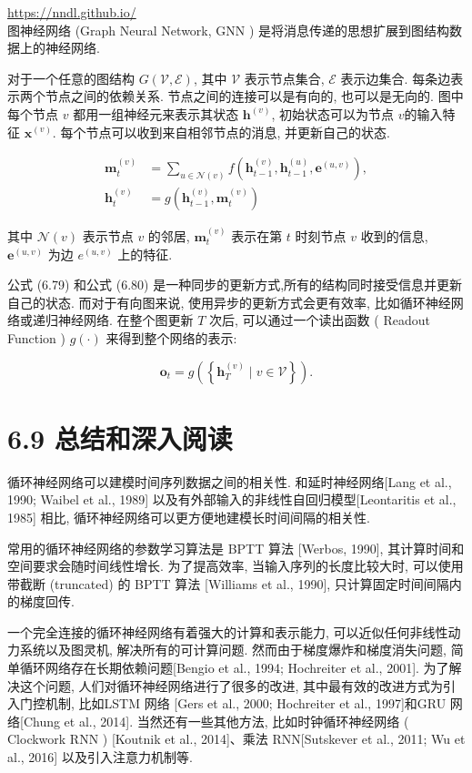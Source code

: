 \documentclass[10pt]{article}
\begin{document}
\href{https://nndl.github.io/}{https://nndl.github.io/}\\
图神经网络 (Graph Neural Network, GNN ) 是将消息传递的思想扩展到图结构数据上的神经网络.

对于一个任意的图结构 $G(\mathcal{V}, \mathcal{E})$, 其中 $\mathcal{V}$ 表示节点集合, $\mathcal{E}$ 表示边集合. 每条边表示两个节点之间的依赖关系. 节点之间的连接可以是有向的, 也可以是无向的. 图中每个节点 $v$ 都用一组神经元来表示其状态 $\boldsymbol{h}^{(v)}$, 初始状态可以为节点 $v$的输入特征 $\boldsymbol{x}^{(v)}$. 每个节点可以收到来自相邻节点的消息, 并更新自己的状态.


\begin{align*}
\boldsymbol{m}_{t}^{(v)} & =\sum_{u \in \mathcal{N}(v)} f\left(\boldsymbol{h}_{t-1}^{(v)}, \boldsymbol{h}_{t-1}^{(u)}, \boldsymbol{e}^{(u, v)}\right),  \tag{6.79}\\
\boldsymbol{h}_{t}^{(v)} & =g\left(\boldsymbol{h}_{t-1}^{(v)}, \boldsymbol{m}_{t}^{(v)}\right) \tag{6.80}
\end{align*}


其中 $\mathcal{N}(v)$ 表示节点 $v$ 的邻居, $\boldsymbol{m}_{t}^{(v)}$ 表示在第 $t$ 时刻节点 $v$ 收到的信息, $\boldsymbol{e}^{(u, v)}$ 为边 $e^{(u, v)}$ 上的特征.

公式 (6.79) 和公式 (6.80) 是一种同步的更新方式,所有的结构同时接受信息并更新自己的状态. 而对于有向图来说, 使用异步的更新方式会更有效率, 比如循环神经网络或递归神经网络. 在整个图更新 $T$ 次后, 可以通过一个读出函数 ( Readout Function ) $g(\cdot)$ 来得到整个网络的表示:


\begin{equation*}
\boldsymbol{o}_{t}=g\left(\left\{\boldsymbol{h}_{T}^{(v)} \mid v \in \mathcal{V}\right\}\right) . \tag{6.81}
\end{equation*}


\section*{6.9 总结和深入阅读}
循环神经网络可以建模时间序列数据之间的相关性. 和延时神经网络[Lang et al., 1990; Waibel et al., 1989] 以及有外部输入的非线性自回归模型[Leontaritis et al., 1985] 相比, 循环神经网络可以更方便地建模长时间间隔的相关性.

常用的循环神经网络的参数学习算法是 BPTT 算法 [Werbos, 1990], 其计算时间和空间要求会随时间线性增长. 为了提高效率, 当输入序列的长度比较大时, 可以使用带截断 (truncated) 的 BPTT 算法 [Williams et al., 1990], 只计算固定时间间隔内的梯度回传.

一个完全连接的循环神经网络有着强大的计算和表示能力, 可以近似任何非线性动力系统以及图灵机, 解决所有的可计算问题. 然而由于梯度爆炸和梯度消失问题, 简单循环网络存在长期依赖问题[Bengio et al., 1994; Hochreiter et al., 2001]. 为了解决这个问题, 人们对循环神经网络进行了很多的改进, 其中最有效的改进方式为引入门控机制, 比如LSTM 网络 [Gers et al., 2000; Hochreiter et al., 1997]和GRU 网络[Chung et al., 2014]. 当然还有一些其他方法, 比如时钟循环神经网络 ( Clockwork RNN ) [Koutnik et al., 2014]、乘法 RNN[Sutskever et al., 2011; Wu et al., 2016] 以及引入注意力机制等.
\end{document}

